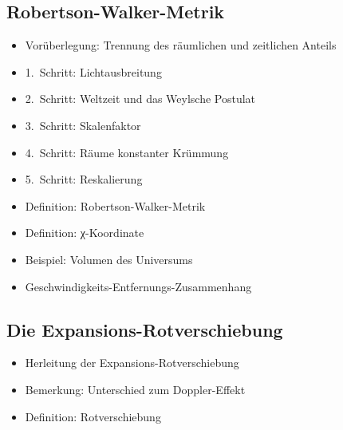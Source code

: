 \documentclass{article}
\begin{document}
\begin{multicols}{2}
    \subsection{Robertson-Walker-Metrik} %
    \label{sub:robertson_walker_metrik}
      \begin{itemize}
        \item Vorüberlegung: Trennung des räumlichen und zeitlichen Anteils
        \item 1.~Schritt: Lichtausbreitung
        \item 2.~Schritt: Weltzeit und das Weylsche Postulat
        \item 3.~Schritt: Skalenfaktor
        \item 4.~Schritt: Räume konstanter Krümmung
        \item 5.~Schritt: Reskalierung
        \item Definition: Robertson-Walker-Metrik
        \item Definition: χ-Koordinate
        \item Beispiel: Volumen des Universums
        \item Geschwindigkeits-Entfernungs-Zusammenhang
      \end{itemize}

    \subsection{Die Expansions-Rotverschiebung} %
    \label{sub:die_expansions_rotverschiebung}
      \begin{itemize}
        \item Herleitung der Expansions-Rotverschiebung
        \item Bemerkung: Unterschied zum Doppler-Effekt
        \item Definition: Rotverschiebung
      \end{itemize}


\end{multicols}
\end{document}
